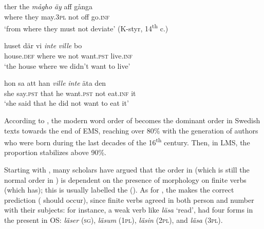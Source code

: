 \documentclass[output=paper]{langscibook}
\begin{document}
\ea\label{ex:intro:5}
\ea\label{ex:intro:5a}
\gll  ther     the \textit{mågho} \textit{äy} aff   gånga                \\
where   they   may.3\textsc{pl}   not   off   go\textsc{.inf}\\
\glt ‘from where they must not deviate’ (K-styr, 14\textsuperscript{th} c.)


\ex\label{ex:intro:5b}
\gll  huset       där     vi \textit{inte} \textit{ville} {bo}\\
        house.\textsc{def}     where   we     not   want.\textsc{pst}  live.\textsc{inf}\\
\glt        ‘the house where we didn’t want to live’


\ex\label{ex:intro:5c}
\gll  hon   sa   att   han   \textit{ville}       \textit{inte}   äta     den    \\
        she         say.\textsc{pst} that he   want.\textsc{pst}  not   eat.\textsc{inf}  it\\
\glt         ‘she said that he did not want to eat it’
\z
\z

According to \citet[176]{Falk1993}, the modern  word order of  becomes the dominant order in Swedish texts towards the end of EMS, reaching over 80\% with the generation of authors who were born during the last decades of the 16\textsuperscript{th} century. Then, in LMS, the proportion stabilizes above 90\%.



Starting with \citet{Kosmeijer1986}, many scholars have argued that the order in  (which is still the normal order in ) is dependent on the presence of  morphology on finite verbs (which  has); this is usually labelled the  (). As for , the  makes the correct prediction ( should occur), since finite verbs agreed in both person and number with their subjects: for instance, a weak verb like \textit{läsa} ‘read’, had four forms in the present  in OS: \textit{läser} (\textsc{sg}), \textit{läsum} (1\textsc{pl}), \textit{läsin} (2\textsc{pl}), and \textit{läsa} (3\textsc{pl}).
\end{document}
